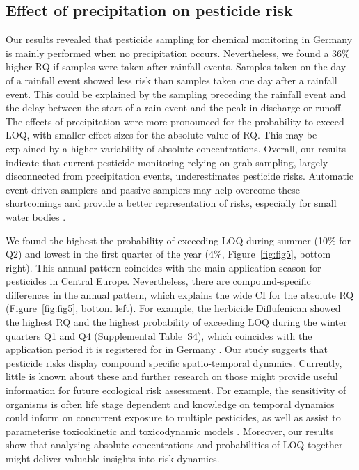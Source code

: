 \documentclass[journal=esthag,manuscript=article]{achemso}
\begin{document}
\subsection{Effect of precipitation on pesticide risk}
Our results revealed that pesticide sampling for chemical monitoring in Germany is mainly performed when no precipitation occurs. 
Nevertheless, we found a 36\% higher RQ if samples were taken after rainfall events. 
Samples taken on the day of a rainfall event showed less risk than samples taken one day after a rainfall event.
This could be explained by the sampling preceding the rainfall event and the delay between the start of a rain event and the peak in discharge or runoff. 
The effects of precipitation were more pronounced for the probability to exceed LOQ, with smaller effect sizes for the absolute value of RQ. 
This may be explained by a higher variability of absolute concentrations.
Overall, our results indicate that current pesticide monitoring relying on grab sampling, largely disconnected from precipitation events, underestimates pesticide risks.
Automatic event-driven samplers \citep{stehle_probabilistic_2013} and passive samplers \citep{fernandez_calibration_2014,moschet_evaluation_2015} may help overcome these shortcomings and provide a better representation of risks, especially for small water bodies \citep{lorenz_specifics_2016}. 

We found the highest the probability of exceeding LOQ during summer (10\% for Q2) and lowest in the first quarter of the year (4\%, Figure~\ref{fig:fig5}, bottom right).
This annual pattern coincides with the main application season for pesticides in Central Europe.
Nevertheless, there are compound-specific differences in the annual pattern, which explains the wide CI for the absolute RQ (Figure~\ref{fig:fig5}, bottom left). 
For example, the herbicide Diflufenican showed the highest RQ and the highest probability of exceeding LOQ during the winter quarters Q1 and Q4 (Supplemental Table~S4), which coincides with the application period it is registered for in Germany \citep{bvl_online_2016}.
Our study suggests that pesticide risks display compound specific spatio-temporal dynamics.
Currently, little is known about these and further research on those might provide useful information for future ecological risk assessment. 
For example, the sensitivity of organisms is often life stage dependent \citep{hutchinson1998analysis} and knowledge on temporal dynamics could inform on concurrent exposure to multiple pesticides, as well as assist to parameterise toxicokinetic and toxicodynamic models \citep{ashauer2016modelling}. 
Moreover, our results show that analysing absolute concentrations and probabilities of LOQ together might deliver valuable insights into risk dynamics.
\end{document}
